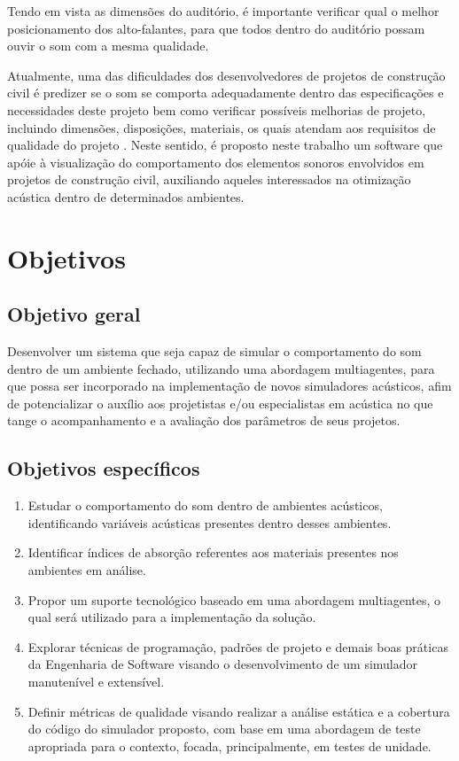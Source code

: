 Tendo em vista as dimensões do auditório, é importante verificar qual o melhor posicionamento dos alto-falantes, para que todos dentro do auditório possam ouvir o som com a mesma qualidade.

Atualmente, uma das dificuldades dos desenvolvedores de projetos de construção civil é predizer se o som se comporta adequadamente dentro das especificações e necessidades deste projeto bem como verificar possíveis melhorias de projeto, incluindo dimensões, disposições, materiais, os quais atendam aos requisitos de qualidade do projeto \cite{santos}. Neste sentido, é proposto neste trabalho um software que apóie à visualização do comportamento dos elementos sonoros envolvidos em projetos de construção civil, auxiliando aqueles interessados na otimização acústica dentro de determinados ambientes.

\section{Objetivos}
\subsection{Objetivo geral}

Desenvolver um sistema que seja capaz de simular o comportamento do som dentro de um ambiente fechado, utilizando uma abordagem multiagentes, para que possa ser incorporado na implementação de novos simuladores acústicos, afim de potencializar o auxílio aos projetistas e/ou especialistas em acústica no que tange o acompanhamento e a avaliação dos parâmetros de seus projetos.

\subsection{Objetivos específicos}

\begin{enumerate}
\item Estudar o comportamento do som dentro de ambientes acústicos, identificando variáveis acústicas presentes dentro desses ambientes.

\item Identificar índices de absorção referentes aos materiais presentes nos ambientes em análise.

\item Propor um suporte tecnológico baseado em uma abordagem multiagentes, o qual será utilizado para a implementação da solução.

\item Explorar técnicas de programação, padrões de projeto e demais boas práticas da Engenharia de Software visando o desenvolvimento de um simulador manutenível e extensível.

\item Definir métricas de qualidade visando realizar a análise estática e a cobertura do código do simulador proposto, com base em uma abordagem de teste apropriada para o contexto, focada, principalmente, em testes de unidade.
\end{enumerate}

